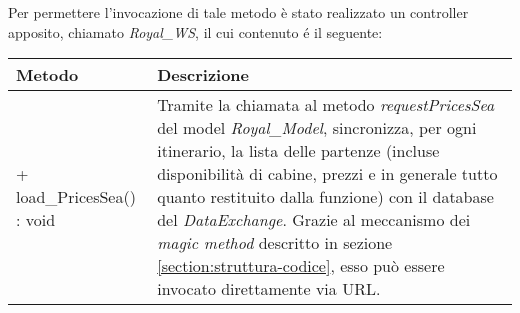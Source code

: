 Per permettere l'invocazione di tale metodo è stato realizzato un controller apposito, chiamato \textit{Royal\_WS}, il cui contenuto é il seguente:
\begin{center}
	\def\arraystretch{1.5}
	\begin{longtable}{ >{\raggedright}p{5.5cm} p{6.8cm}} 
		\hline
		\textbf{Metodo} & \textbf{Descrizione} \\
		\hline
		+ load\_PricesSea() : void & Tramite la chiamata al metodo \textit{requestPricesSea} del model \textit{Royal\_Model}, sincronizza, per ogni itinerario, la lista delle partenze (incluse disponibilità di cabine, prezzi e in generale tutto quanto restituito dalla funzione) con il database del \textit{DataExchange}. Grazie al meccanismo dei \textit{magic method} descritto in sezione \ref{section:struttura-codice}, esso può essere invocato direttamente via URL.\\
		\hline
	\end{longtable}
\end{center}

